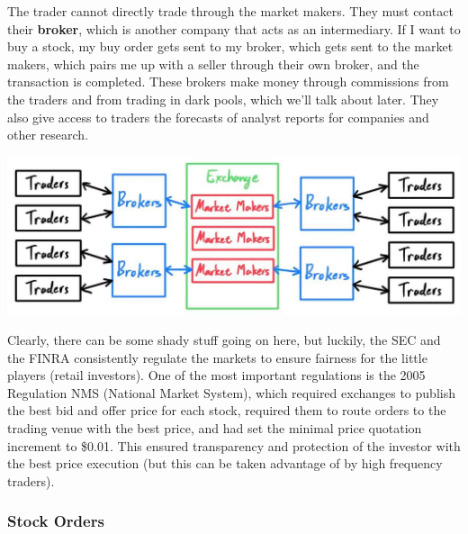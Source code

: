 \documentclass{article}
\begin{document}
  The trader cannot directly trade through the market makers. They must contact their \textbf{broker}, which is another company that acts as an intermediary. If I want to buy a stock, my buy order gets sent to my broker, which gets sent to the market makers, which pairs me up with a seller through their own broker, and the transaction is completed. These brokers make money through commissions from the traders and from trading in dark pools, which we'll talk about later. They also give access to traders the forecasts of analyst reports for companies and other research. 

  \begin{center}
      \includegraphics[scale=0.3]{img/exchange.jpg}
  \end{center}

  Clearly, there can be some shady stuff going on here, but luckily, the SEC and the FINRA consistently regulate the markets to ensure fairness for the little players (retail investors). One of the most important regulations is the 2005 Regulation NMS (National Market System), which required exchanges to publish the best bid and offer price for each stock, required them to route orders to the trading venue with the best price, and had set the minimal price quotation increment to \$0.01. This ensured transparency and protection of the investor with the best price execution (but this can be taken advantage of by high frequency traders). 


  \subsubsection{Stock Orders}
\end{document}
